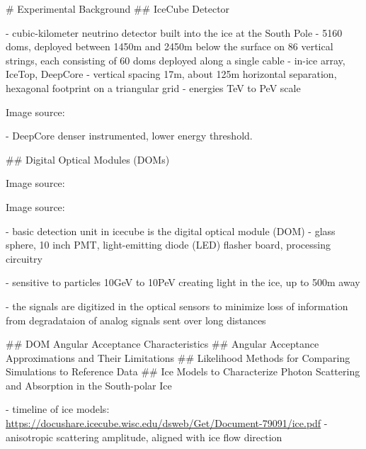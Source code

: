 
# Experimental Background
## IceCube Detector

- cubic-kilometer neutrino detector built into the ice at the South Pole \cite{instrumentation}
- 5160 doms, deployed between 1450m and 2450m below the surface on 86 vertical strings, each consisting of 60 doms deployed along a single cable \cite{instrumentation}
- in-ice array, IceTop, DeepCore \cite{instrumentation}
- vertical spacing 17m, about 125m horizontal separation, hexagonal footprint on a triangular grid \cite{instrumentation}
- energies TeV to PeV scale \cite{instrumentation}

 Image source: \cite{instrumentation}

- DeepCore denser instrumented, lower energy threshold. \cite{instrumentation}



## Digital Optical Modules (DOMs)

 Image source: \cite{instrumentation}

 Image source: \cite{firstyearperformance}

- basic detection unit in icecube is the digital optical module (DOM) \cite{instrumentation}
- glass sphere, 10 inch PMT, light-emitting diode (LED) flasher board, processing circuitry \cite{instrumentation}

- sensitive to particles 10GeV to 10PeV creating light in the ice, up to 500m away \cite{instrumentation}

- the signals are digitized in the optical sensors to minimize loss of information from degradataion of analog signals sent over long distances \cite{firstyearperformance}

## DOM Angular Acceptance Characteristics
## Angular Acceptance Approximations and Their Limitations
## Likelihood Methods for Comparing Simulations to Reference Data
## Ice Models to Characterize Photon Scattering and Absorption in the South-polar Ice

- timeline of ice models: \url{https://docushare.icecube.wisc.edu/dsweb/Get/Document-79091/ice.pdf} \cite{flasherdataderivedicemodels}
- anisotropic scattering amplitude, aligned with ice flow direction \cite{icrc17pocam}

